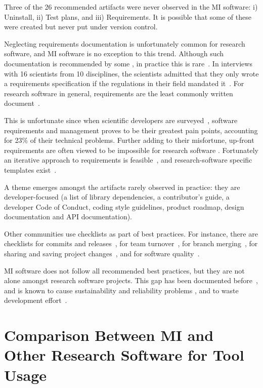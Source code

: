 \documentclass[12pt, 3p, times]{elsarticle} %
\begin{document}
Three of the 26 recommended artifacts were never observed in the MI software:
i) Uninstall, ii) Test plans, and iii) Requirements. It is possible that
some of these were created but never put under version control.

Neglecting requirements documentation is unfortunately common for research
software, and MI software is no exception to this trend.  Although such
documentation is recommended by some \cite{TobiasEtAl2018, HerouxEtAl2008,
SmithAndKoothoor2016}, in practice this is rare~\cite{HeatonAndCarver2015}.  In
interviews with 16 scientists from 10 disciplines, the scientists admitted that
they only wrote a requirements specification if the regulations in their field
mandated it~\cite{SandersAndKelly2008}.  For research software in general,
requirements are the least commonly written document~\cite{Nguyen-HoanEtAl2010}. 

This is unfortunate since when scientific developers are
surveyed~\cite{WieseEtAl2019}, software requirements and management proves to be
their greatest pain points, accounting for 23\% of their technical problems.
Further adding to their misfortune, up-front requirements are often viewed to be
impossible for research software \cite{CarverEtAl2007, SegalAndMorris2008}.
Fortunately an iterative approach to requirements is feasible~\cite{Smith2016},
and research-software specific templates exist~\cite{SmithEtAl2007}. 

A theme emerges amongst the artifacts rarely observed in practice: they
are developer-focused (a list of library dependencies, a contributor's guide,
a developer Code of Conduct, coding style guidelines, product roadmap, design
documentation and API documentation).

Other communities use checklists as part of best practices. For instance, there
are checklists for commits and releases~\cite{HerouxEtAl2008}, for team
turnover~\cite{HerouxAndBernholdt2018}, for branch merging~\cite{Brown2015}, for
sharing and saving project changes~\cite{WilsonEtAl2016}, and for software
quality~\cite{ThielEtAl2020, SSI2022}.

MI software does not follow all recommended best practices, but they are not
alone amongst research software projects. This gap has been documented
before~\cite{Storer2017,JohansonAndHasselbring2018}, and is known to cause
sustainability and reliability problems \cite{FaulkEtAl2009}, and to waste
development effort~\cite{deSouzaEtAl2019}.

\section{Comparison Between MI and Other Research Software for Tool Usage}
\label{Sec_CompareTools}
\end{document}
